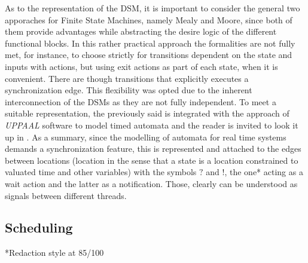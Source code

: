 As to the representation of the DSM, it is important to consider the general two apporaches for Finite State Machines, namely Mealy and Moore, since both 
of them provide advantages while abstracting the desire logic of the different functional blocks. In this rather practical approach the formalities are not fully
met, for instance, to choose strictly for transitions dependent on the state and inputs with actions, but using exit actions as part of each state, when it is convenient.
There are though transitions that explicitly executes a synchronization edge. This flexibility was opted due to the inherent interconnection of the DSMs
as they are not fully independent. To meet a suitable representation, the previously said is integrated with the approach of \emph{UPPAAL} 
software to model timed automata and the reader is invited to look it up in \cite{uppaal_tutorial}.
As a summary, since the modelling of automata for real time systems demands a synchronization feature, this is represented and attached to the edges between 
locations (location in the sense that a state is a location constrained to valuated time and other variables) with the symbols $?$ and $!$, the one* acting as 
a wait action and the latter as a notification. Those, clearly can be understood as signals between different threads.


\subsection{Scheduling}\label{sec:scheduling_intro}
*Redaction style at 85/100
        
     


